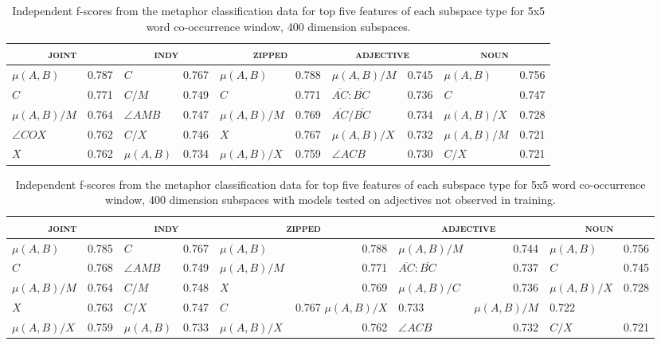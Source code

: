 \begin{table}
\centering
\begin{tabular}{lr|lr|lr|lr|lr}
\hline
\multicolumn{2}{c}{\textsc{joint}} & \multicolumn{2}{c}{\textsc{indy}} & \multicolumn{2}{c}{\textsc{zipped}} & \multicolumn{2}{c}{\textsc{adjective}} & \multicolumn{2}{c}{\textsc{noun}} \\
\hline
$\mu(A,B)$ & 0.787 & $C$ & 0.767 & $\mu(A,B)$ & 0.788 & $\mu(A,B)/M$ & 0.745 & $\mu(A,B)$ & 0.756 \\
$C$ & 0.771 & $C/M$ & 0.749 & $C$ & 0.771 & $\overline{AC}:\overline{BC}$ & 0.736 & $C$ & 0.747 \\
$\mu(A,B)/M$ & 0.764 & $\angle AMB$ & 0.747 & $\mu(A,B)/M$ & 0.769 & $\overline{AC}/\overline{BC}$ & 0.734 & $\mu(A,B)/X$ & 0.728 \\
$\angle COX$ & 0.762 & $C/X$ & 0.746 & $X$ & 0.767 & $\mu(A,B)/X$ & 0.732 & $\mu(A,B)/M$ & 0.721 \\
$X$ & 0.762 & $\mu(A,B)$ & 0.734 & $\mu(A,B)/X$ & 0.759 & $\angle ACB$ & 0.730 & $C/X$ & 0.721 \\
\hline
\end{tabular}
\caption[Top Independent Features for Metaphor Classification]{Independent f-scores from the metaphor classification data for top five features of each subspace type for 5x5 word co-occurrence window, 400 dimension subspaces.}
\label{tab:ind-metaphor}
\end{table}

\begin{table}
\centering
\begin{tabular}{lr|lr|lr|lr|lr}
\hline
\multicolumn{2}{c}{\textsc{joint}} & \multicolumn{2}{c}{\textsc{indy}} & \multicolumn{2}{c}{\textsc{zipped}} & \multicolumn{2}{c}{\textsc{adjective}} & \multicolumn{2}{c}{\textsc{noun}} \\
\hline
$\mu(A,B)$ & 0.785 & $C$ & 0.767 & $\mu(A,B)$ & 0.788 & $\mu(A,B)/M$ & 0.744 & $\mu(A,B)$ & 0.756 \\
$C$ & 0.768 & $\angle AMB$ & 0.749 & $\mu(A,B)/M$ & 0.771 & $\overline{AC}:\overline{BC}$ & 0.737 & $C$ & 0.745 \\
$\mu(A,B)/M$ & 0.764 & $C/M$ & 0.748 & $X$ & 0.769 & $\mu(A,B)/C$ & 0.736 & $\mu(A,B)/X$ & 0.728 \\
$X$ & 0.763 & $C/X$ & 0.747 & $C$ & 0.767 $\mu(A,B)/X$ & 0.733 & $\mu(A,B)/M$ & 0.722 \\
$\mu(A,B)/X$ & 0.759 & $\mu(A,B)$ & 0.733 & $\mu(A,B)/X$ & 0.762 & $\angle ACB$ & 0.732 & $C/X$ & 0.721 \\
\hline
\end{tabular}
\caption[Top Independent Features for Metaphor Classification with Unseen Adjectives]{Independent f-scores from the metaphor classification data for top five features of each subspace type for 5x5 word co-occurrence window, 400 dimension subspaces with models tested on adjectives not observed in training.}
\label{tab:ind-metaphor}
\end{table}

